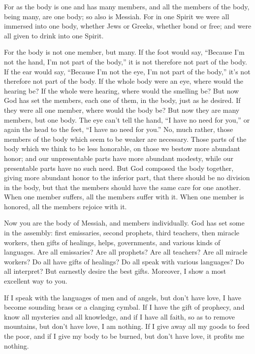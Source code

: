 \myverse{}For as the body is one and has many members, and all the members
of the body, being many, are one body; so also is Messiah.
\myverse{}For in one Spirit we were all immersed into one body, whether Jews or Greeks,
whether bond or free; and were all given to drink into one Spirit.

\myverse{}For the body is not one member, but many.
\myverse{}If the foot would say, “Because I’m not the hand, I’m not part of the body,”
it is not therefore not part of the body.
\myverse{}If the ear would say, “Because I’m not the eye, I’m not part of the body,”
it’s not therefore not part of the body.
\myverse{}If the whole body were an eye, where would the hearing be? If the whole were
hearing, where would the smelling be?
\myverse{}But now God has set the members, each one of them, in the body, just as he
desired.
\myverse{}If they were all one member, where would the body be?
\myverse{}But now they are many members, but one body.
\myverse{}The eye can’t tell the hand, “I have no need for you,” or again the head
to the feet, “I have no need for you.”
\myverse{}No, much rather, those members of the body which seem to be weaker are necessary.
\myverse{}Those parts of the body which we think to be less honorable, on those we
bestow more abundant honor; and our unpresentable parts have more abundant modesty,
\myverse{}while our presentable parts have no such need. But God composed the body
together, giving more abundant honor to the inferior part,
\myverse{}that there should be no division in the body, but that the members should
have the same care for one another.
\myverse{}When one member suffers, all the members suffer with it. When one member
is honored, all the members rejoice with it.

\myverse{}Now you are the body of Messiah, and members individually.
\myverse{}God has set some in the assembly: first emissaries, second prophets, third
teachers, then miracle workers, then gifts of healings, helps, governments, and various kinds of languages.
\myverse{}Are all emissaries? Are all prophets? Are all teachers? Are all miracle workers?
\myverse{}Do all have gifts of healings? Do all speak with various languages? Do all
interpret?
\myverse{}But earnestly desire the best gifts. Moreover, I show a most excellent way
to you.


\mychapter{} \myverse*{}If I speak with the languages of men and of angels, but don’t
have love, I have become sounding brass or a clanging cymbal.
\myverse{}If I have the gift of prophecy, and know all mysteries and all knowledge, and
if I have all faith, so as to remove mountains, but don’t have love, I am nothing.
\myverse{}If I give away all my goods to feed the poor, and if I give my body to be burned,
but don’t have love, it profits me nothing.

